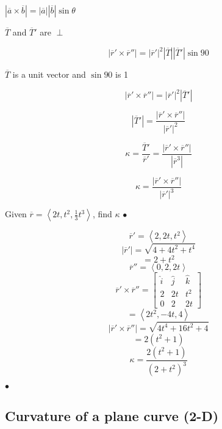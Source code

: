 $\left| \overline{a} \times  \overline{b}  \right|  = \left| \overline{a} \right| \left| \overline{b} \right| \sin \theta$

$\overline{T}$ and $\overline{T}'$ are $\perp$

\[\left| \overline{r}' \times  \overline{r}''  \right| = \left| \overline{r}' \right|^2 \left|  \overline{T}\right|\left|    \overline{T}' \right|\sin 90\]

$\overline{T}$ is a unit vector and $\sin 90$ is 1

\[\left| \overline{r}' \times  \overline{r}''  \right| = \left| \overline{r}' \right|^2 \left|    \overline{T}' \right|\]

\[\left| \overline{T}' \right| = \frac{\left| \overline{r}' \times \overline{r}''\right| }{\left| \overline{r}' \right|^2}\]

\[\kappa = \frac{\overline{T}'}{\overline{r}'} = \frac{\left| \overline{r}' \times  \overline{r} '' \right| }{\left| \overline{r}^{3} \right| }\]


\[\boxed{\kappa = \frac{\left| \overline{r}' \times \overline{r}'' \right| }{\left| \overline{r}' \right|^3}}\]


\begin{example}[Curvature]
	Given $ \overline{r} = \left< 2t, t^2, \frac{1}{3}t^3 \right>$, find $\kappa$
\smallskip\hfill$\bullet$\end{example}

\begin{solution}[Curvature]

	\[\overline{r}' = \left< 2, 2t, t^2 \right>\]
	\[\left| \overline{r}' \right| = \sqrt{4 + 4t^2 + t^{4}} \]
	\[= 2 + t^2\]
	\[\overline{r}'' = \left<0, 2, 2t \right>\]
	\[\overline{r}' \times  \overline{r}'' = \begin{bmatrix} \hat{i} & \hat{j} & \hat{k} \\ 2 & 2t & t^2 \\ 0 & 2 & 2t \end{bmatrix} \]
	\[= \left<2t^2, -4t, 4 \right>\]
	\[\left| \overline{r}' \times \overline{r}'' \right| = \sqrt{4t^{4} + 16 t^2 + 4}  \]
	\[= 2(t^2+1)\]
	\[\kappa = \frac{2(t^2+1)}{(2+t^2)^3}\]

\smallskip\hfill$\bullet$\end{solution}


\subsection{Curvature of a plane curve (2-D)}%
\label{sub:curvature_of_a_plane_curve_2_d_}

